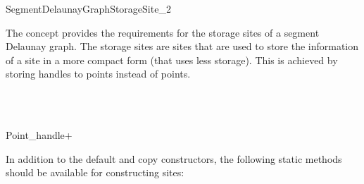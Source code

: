 


\begin{ccRefConcept}{SegmentDelaunayGraphStorageSite_2} 


\ccDefinition

The concept  provides the
requirements for the storage sites of a segment Delaunay graph. The
storage sites are sites that are used to store the information of a
site in a more compact form (that uses less storage). This is achieved
by storing handles to points instead of points.


\ccRefines
{}\\
\\

{Point_handle+}{}
\ccThreeToTwo
\ccTypes
{}
\ccGlue
{}



\ccCreation


In addition to the default and copy constructors, the following static
methods should be available for constructing sites:


\end{ccRefConcept}
